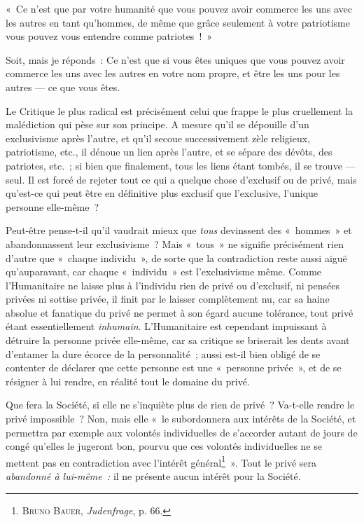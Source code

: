 \documentclass[french,twoside]{book} %
\begin{document}
« Ce n’est que par votre humanité que vous pouvez avoir commerce les uns avec les autres en tant qu’hommes, de même que grâce seulement à votre patriotisme vous pouvez vous entendre comme patriotes ! »\par
Soit, mais je réponds : Ce n’est que si vous êtes uniques que vous pouvez avoir commerce les uns  avec les autres en votre nom propre, et être les uns pour les autres — ce que vous êtes.\par
Le Critique le plus radical est précisément celui que frappe le plus cruellement la malédiction qui pèse sur son principe. A mesure qu’il se dépouille d’un exclusivisme après l’autre, et qu’il secoue successivement zèle religieux, patriotisme, etc., il dénoue un lien après l’autre, et se sépare des dévôts, des patriotes, etc. ; si bien que finalement, tous les liens étant tombés, il se trouve — seul. Il est forcé de rejeter tout ce qui a quelque chose d’exclusif ou de privé, mais qu’est-ce qui peut être en définitive plus exclusif que l’exclusive, l’unique personne elle-même ?\par
Peut-être pense-t-il qu’il vaudrait mieux que \emph{tous }devinssent des « hommes » et abandonnassent leur exclusivisme ? Mais « tous » ne signifie précisément rien d’autre que « chaque individu », de sorte que la contradiction reste aussi aiguë qu’auparavant, car chaque « individu » est l’exclusivisme même. Comme l’Humanitaire ne laisse plus à l’individu rien de privé ou d’exclusif, ni pensées privées ni sottise privée, il finit par le laisser complètement nu, car sa haine absolue et fanatique du privé ne permet à son égard aucune tolérance, tout privé étant essentiellement \emph{inhumain}. L’Humanitaire est cependant impuissant à détruire la personne privée elle-même, car sa critique se briserait les dents avant d’entamer la dure écorce de la personnalité ; aussi est-il bien obligé de se contenter de déclarer que cette personne est une « personne privée », et de se résigner à lui rendre, en réalité tout le domaine du privé.\par
Que fera la Société, si elle ne s’inquiète plus de rien de privé ? Va-t-elle rendre le privé impossible ? Non, mais elle « le subordonnera aux intérêts de la Société, et permettra par exemple aux volontés individuelles  de s’accorder autant de jours de congé qu’elles le jugeront bon, pourvu que ces volontés individuelles ne se mettent pas en contradiction avec l’intérêt général\footnote{ \noindent B{\scshape runo} B{\scshape auer}, \emph{Judenfrage}, p. 66.
 } ». Tout le privé sera \emph{abandonné à lui-même :} il ne présente aucun intérêt pour la Société.\par
\end{document}
